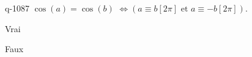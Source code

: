 \begin{truefalse}{q-1087}
$\cos(a)=\cos(b)$  $\Leftrightarrow \left(a\equiv b [2\pi]\text{ et } a\equiv -b [2\pi]\right)$.
\item Vrai
\item* Faux
\end{truefalse}

